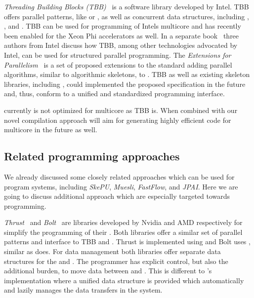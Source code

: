 \bigskip

\emph{Threading Building Blocks (TBB)}~\cite{Reinders2007} is a software library developed by Intel.
TBB offers parallel patterns, like  or , as well as concurrent data structures, including , , and .
TBB can be used for programming of Intels multicore \CPUs and has recently been enabled for the Xeon Phi accelerators as well.
In a separate book~\cite{McCoolRoRe2012} three authors from Intel discuss how TBB, among other technologies advocated by Intel, can be used for structured parallel programming.
The \emph{\Cpp Extensions for Parallelism}~\cite{CppParallelism} is a set of proposed extensions to the \Cpp standard adding parallel algorithms, similar to algorithmic skeletons, to \Cpp.
TBB as well as existing skeleton libraries, including \SkelCL, could implemented the proposed specification in the future and, thus, conform to a unified and standardized programming interface.

\SkelCL currently is not optimized for multicore \CPUs as TBB is.
When combined with our novel compilation approach \SkelCL will aim for generating highly efficient code for multicore \CPUs in the future as well.

\subsection{Related \GPU programming approaches}
We already discussed some closely related approaches which can be used for program \GPU systems, including \emph{SkePU}, \emph{Muesli}, \emph{FastFlow}, and \emph{JPAI}.
Here we are going to discuss additional approach which are especially targeted towards \GPU programming.

\bigskip

\emph{Thrust}~\cite{BellHo2011} and \emph{Bolt}~\cite{Thrust} are \Cpp libraries developed by Nvidia and AMD respectively for simplify the programming of their \GPUs.
Both libraries offer a similar set of parallel patterns and interface to TBB and \SkelCL.
Thrust is implemented using \CUDA and Bolt uses \OpenCL, similar as \SkelCL does.
For data management both libraries offer separate data structures for the \CPU and \GPU.
The programmer has explicit control, but also the additional burden, to move data between \CPU and \GPU.
This is different to \SkelCL's implementation where a unified data structure is provided which automatically and lazily manages the data transfers in the system.

